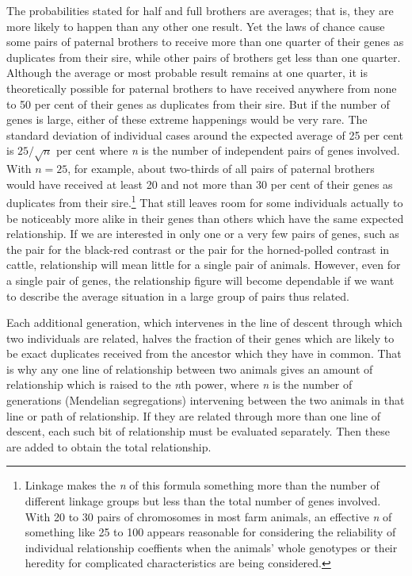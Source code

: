 The probabilities stated for half and full brothers are averages; that
is, they are more likely to happen than any other one result. Yet the
laws of chance cause some pairs of paternal brothers to receive more
than one quarter of their genes as duplicates from their sire, while other
pairs of brothers get less than one quarter. Although the average or
most probable result remains at one quarter, it is theoretically possible
for paternal brothers to have received anywhere from none to 50 per
cent of their genes as duplicates from their sire. But if the number of
genes is large, either of these extreme happenings would be very rare.
The standard deviation of individual cases around the expected
average of 25 per cent is $25/\sqrt{n}$ per cent where \textit{n} is the
number of independent pairs of genes involved. With $n = 25$, for example, about
two-thirds of all pairs of paternal brothers would have received at
least 20 and not more than 30 per cent of their genes as duplicates from
their sire.\footnote{Linkage makes the \textit{n} of this formula something
more than the number of different linkage groups but less than the total
number of genes involved. With 20 to 30 pairs of chromosomes in most farm
animals, an effective \textit{n} of something like 25 to 100 appears reasonable
for considering the reliability of individual relationship coeffients when
the animals' whole genotypes or their heredity for complicated characteristics
are being considered.} That still leaves room for some individuals actually to be
noticeably more alike in their genes than others which have the same
expected relationship. If we are interested in only one or a very few
pairs of genes, such as the pair for the black-red contrast or the pair for
the horned-polled contrast in cattle, relationship will mean little for a
single pair of animals. However, even for a single pair of genes, the
relationship figure will become dependable if we want to describe the
average situation in a large group of pairs thus related.

Each additional generation, which intervenes in the line of descent
through which two individuals are related, halves the fraction of their
genes which are likely to be exact duplicates received from the ancestor
which they have in common. That is why any one line of relationship
between two animals gives an amount of relationship which is 
raised to the \textit{n}th power, where \textit{n} is the number of
generations (Mendelian segregations) intervening between the two animals
in that line or path of relationship. If they are related through more
than one line of descent, each such bit of relationship must be evaluated
separately. Then these are added to obtain the total relationship.

